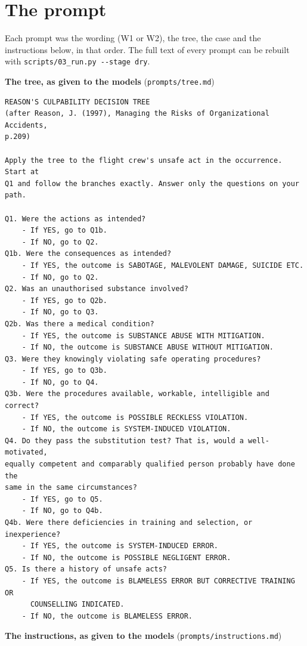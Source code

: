 \documentclass[review,12pt]{elsarticle}
\begin{document}
\appendix
\hypertarget{the-prompt}{%
\section{The prompt}\label{the-prompt}}

Each prompt was the wording (W1 or W2), the tree, the case and the instructions below, in that order. The full text of every prompt can be rebuilt with \texttt{scripts/03\_run.py\ -\/-stage\ dry}.

\textbf{The tree, as given to the models} (\texttt{prompts/tree.md})

{\footnotesize\linespread{1}\selectfont
\begin{verbatim}
REASON'S CULPABILITY DECISION TREE
(after Reason, J. (1997), Managing the Risks of Organizational Accidents,
p.209)

Apply the tree to the flight crew's unsafe act in the occurrence. Start at
Q1 and follow the branches exactly. Answer only the questions on your
path.

Q1. Were the actions as intended?
    - If YES, go to Q1b.
    - If NO, go to Q2.
Q1b. Were the consequences as intended?
    - If YES, the outcome is SABOTAGE, MALEVOLENT DAMAGE, SUICIDE ETC.
    - If NO, go to Q2.
Q2. Was an unauthorised substance involved?
    - If YES, go to Q2b.
    - If NO, go to Q3.
Q2b. Was there a medical condition?
    - If YES, the outcome is SUBSTANCE ABUSE WITH MITIGATION.
    - If NO, the outcome is SUBSTANCE ABUSE WITHOUT MITIGATION.
Q3. Were they knowingly violating safe operating procedures?
    - If YES, go to Q3b.
    - If NO, go to Q4.
Q3b. Were the procedures available, workable, intelligible and correct?
    - If YES, the outcome is POSSIBLE RECKLESS VIOLATION.
    - If NO, the outcome is SYSTEM-INDUCED VIOLATION.
Q4. Do they pass the substitution test? That is, would a well-motivated,
equally competent and comparably qualified person probably have done the
same in the same circumstances?
    - If YES, go to Q5.
    - If NO, go to Q4b.
Q4b. Were there deficiencies in training and selection, or inexperience?
    - If YES, the outcome is SYSTEM-INDUCED ERROR.
    - If NO, the outcome is POSSIBLE NEGLIGENT ERROR.
Q5. Is there a history of unsafe acts?
    - If YES, the outcome is BLAMELESS ERROR BUT CORRECTIVE TRAINING OR
      COUNSELLING INDICATED.
    - If NO, the outcome is BLAMELESS ERROR.
\end{verbatim}
}

\textbf{The instructions, as given to the models} (\texttt{prompts/instructions.md})
\end{document}
